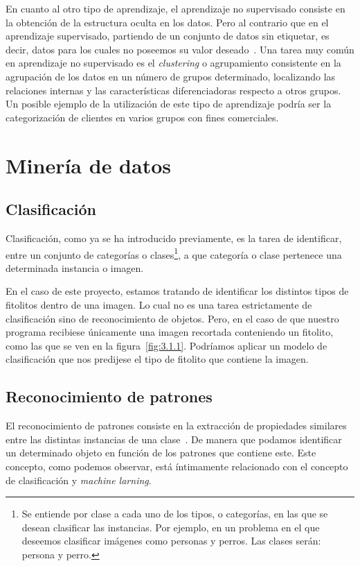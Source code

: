 En cuanto al otro tipo de aprendizaje, el aprendizaje no supervisado consiste en la obtención de la estructura oculta en los datos. Pero al contrario que en el aprendizaje supervisado, partiendo de un conjunto de datos sin etiquetar, es decir, datos para los cuales no poseemos su valor deseado~\cite{wiki:unsupervisedLearning}. Una tarea muy común en aprendizaje no supervisado es el \textit{clustering} o agrupamiento consistente en la agrupación de los datos en un número de grupos determinado, localizando las relaciones internas y las características diferenciadoras respecto a otros grupos. Un posible ejemplo  de la utilización de este tipo de aprendizaje podría ser la categorización de clientes en varios grupos con fines comerciales.

\section{Minería de datos}
\label{md}
\subsection{Clasificación}

Clasificación, como ya se ha introducido previamente, es la tarea de identificar, entre un conjunto de  categorías o clases\footnote{Se entiende por clase a cada uno de los tipos, o categorías, en las que se desean clasificar las instancias. Por ejemplo, en un problema en el que deseemos clasificar imágenes como personas y perros. Las clases serán: persona y perro.}, a que categoría o clase pertenece una determinada instancia o imagen.

En el caso de este proyecto, estamos tratando de identificar los distintos tipos de fitolitos dentro de una imagen. Lo cual no es una tarea estrictamente de clasificación sino de reconocimiento de objetos. Pero, en el caso de que nuestro programa recibiese únicamente una imagen recortada conteniendo un fitolito, como las que se ven en la figura~\ref{fig:3.1.1}. Podríamos aplicar un modelo de clasificación que nos predijese el tipo de fitolito que contiene la imagen.

\subsection{Reconocimiento de patrones}

El reconocimiento de patrones consiste en la extracción de propiedades similares entre las distintas instancias de una clase~\cite{wiki:patternrecognition}. De manera que podamos identificar un determinado objeto en función de los patrones que contiene este. Este concepto, como podemos observar, está íntimamente relacionado con el concepto de clasificación y \textit{machine larning}.

